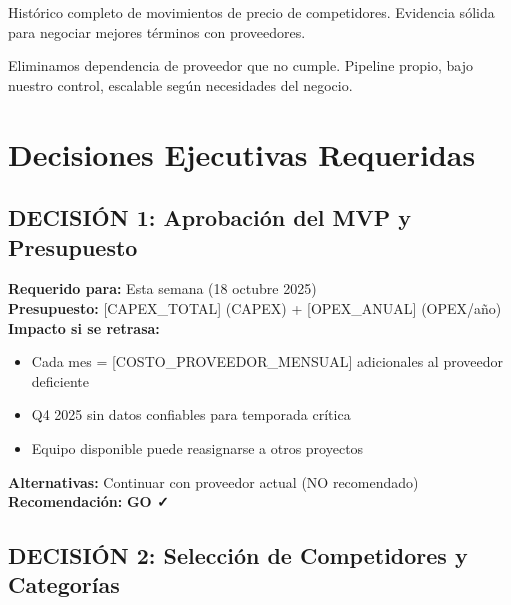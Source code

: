 \documentclass[12pt,a4paper]{article}
\begin{document}
\begin{tcolorbox}[colback=primaryblue!10, colframe=primaryblue, title=\textbf{4. Poder de Negociación con Marcas}]
Histórico completo de movimientos de precio de competidores. Evidencia sólida para negociar mejores términos con proveedores.
\end{tcolorbox}

\begin{tcolorbox}[colback=successgreen!10, colframe=successgreen, title=\textbf{5. Independencia Estratégica}]
Eliminamos dependencia de proveedor que no cumple. Pipeline propio, bajo nuestro control, escalable según necesidades del negocio.
\end{tcolorbox}

\newpage
\section{Decisiones Ejecutivas Requeridas}

\subsection*{DECISIÓN 1: Aprobación del MVP y Presupuesto}

\begin{tcolorbox}[colback=lightgray, colframe=black]
\textbf{Requerido para:} Esta semana (18 octubre 2025)\\
\textbf{Presupuesto:} [CAPEX\_TOTAL] (CAPEX) + [OPEX\_ANUAL] (OPEX/año)\\
\textbf{Impacto si se retrasa:}
\begin{itemize}[leftmargin=*]
    \item Cada mes = [COSTO\_PROVEEDOR\_MENSUAL] adicionales al proveedor deficiente
    \item Q4 2025 sin datos confiables para temporada crítica
    \item Equipo disponible puede reasignarse a otros proyectos
\end{itemize}
\textbf{Alternativas:} Continuar con proveedor actual (NO recomendado)\\
\textbf{Recomendación:} \textcolor{successgreen}{\textbf{GO ✓}}
\end{tcolorbox}

\subsection*{DECISIÓN 2: Selección de Competidores y Categorías}
\end{document}
